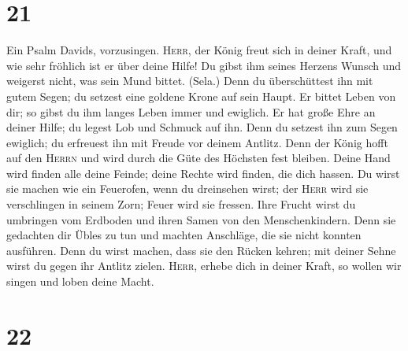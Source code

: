 \hypertarget{section-20}{%
\section{21}\label{section-20}}

 Ein Psalm Davids, vorzusingen. 
\textsc{Herr}, der König freut sich in deiner Kraft, und wie sehr
fröhlich ist er über deine Hilfe!  Du gibst ihm seines
Herzens Wunsch und weigerst nicht, was sein Mund bittet. (Sela.)
 Denn du überschüttest ihn mit gutem Segen; du setzest
eine goldene Krone auf sein Haupt.  Er bittet Leben von
dir; so gibst du ihm langes Leben immer und ewiglich.  Er
hat große Ehre an deiner Hilfe; du legest Lob und Schmuck auf ihn.
 Denn du setzest ihn zum Segen ewiglich; du erfreuest ihn
mit Freude vor deinem Antlitz.  Denn der König hofft auf
den \textsc{Herrn} und wird durch die Güte des Höchsten fest bleiben.
 Deine Hand wird finden alle deine Feinde; deine Rechte
wird finden, die dich hassen.  Du wirst sie machen wie
ein Feuerofen, wenn du dreinsehen wirst; der \textsc{Herr} wird sie
verschlingen in seinem Zorn; Feuer wird sie fressen. 
Ihre Frucht wirst du umbringen vom Erdboden und ihren Samen von den
Menschenkindern.  Denn sie gedachten dir Übles zu tun und
machten Anschläge, die sie nicht konnten ausführen.  Denn
du wirst machen, dass sie den Rücken kehren; mit deiner Sehne wirst du
gegen ihr Antlitz zielen.  \textsc{Herr}, erhebe dich in
deiner Kraft, so wollen wir singen und loben deine Macht.

\hypertarget{section-21}{%
\section{22}\label{section-21}}

